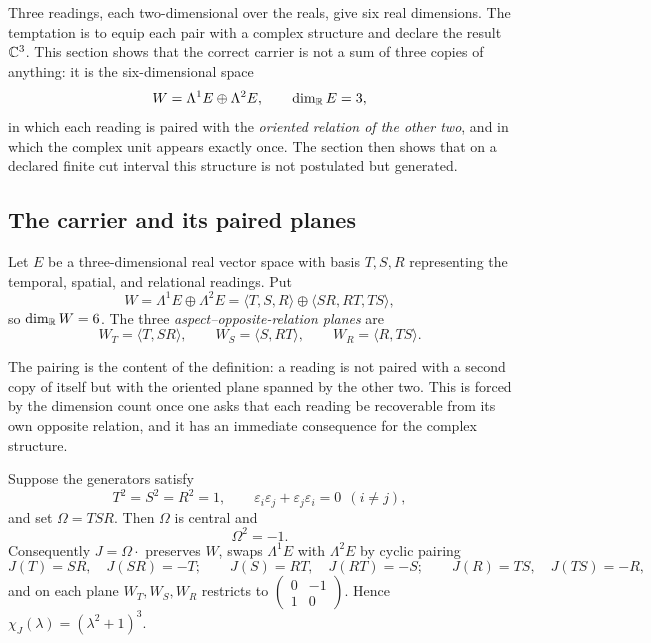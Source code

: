 \label{sec:six-state-body}

Three readings, each two-dimensional over the reals, give six real dimensions.  The
temptation is to equip each pair with a complex structure and declare the result
$\mathbb{C}^{3}$.  This section shows that the correct carrier is not a sum of three copies of
anything: it is the six-dimensional space
\[
  W=\Lambda^{1}E\oplus\Lambda^{2}E,\qquad \dim_{\mathbb{R}}E=3,
\]
in which each reading is paired with the \emph{oriented relation of the other two},
and in which the complex unit appears exactly once.  The section then shows that on a
declared finite cut interval this structure is not postulated but generated.

\subsection{The carrier and its paired planes}

\begin{definition}\label{def:six-state-carrier}
Let $E$ be a three-dimensional real vector space with basis $T,S,R$ representing the
temporal, spatial, and relational readings.  Put
\[
  W=\Lambda^{1}E\oplus\Lambda^{2}E=\langle T,S,R\rangle\oplus\langle SR,RT,TS\rangle ,
\]
so $\dim_{\mathbb{R}}W=6$.  The three \emph{aspect--opposite-relation planes} are
\[
  W_T=\langle T,SR\rangle,\qquad W_S=\langle S,RT\rangle,\qquad W_R=\langle R,TS\rangle .
\]
\end{definition}

The pairing is the content of the definition: a reading is not paired with a second
copy of itself but with the oriented plane spanned by the other two.  This is forced
by the dimension count once one asks that each reading be recoverable from its own
opposite relation, and it has an immediate consequence for the complex structure.

\begin{proposition}\label{prop:one-complex-unit}
Suppose the generators satisfy
\[
  T^{2}=S^{2}=R^{2}=1,\qquad \varepsilon_i\varepsilon_j+\varepsilon_j\varepsilon_i=0
  \ \ (i\neq j),
\]
and set $\Omega=TSR$.  Then $\Omega$ is central and
\[
  \Omega^{2}=-1 .
\]
Consequently $J=\Omega\cdot$ preserves $W$, swaps $\Lambda^{1}E$ with
$\Lambda^{2}E$ by cyclic pairing
\[
  J(T)=SR,\quad J(SR)=-T;\qquad J(S)=RT,\quad J(RT)=-S;\qquad
  J(R)=TS,\quad J(TS)=-R,
\]
and on each plane $W_T,W_S,W_R$ restricts to
$\begin{pmatrix}0&-1\\ 1&0\end{pmatrix}$.  Hence
$\chi_J(\lambda)=(\lambda^{2}+1)^{3}$.
\end{proposition}

